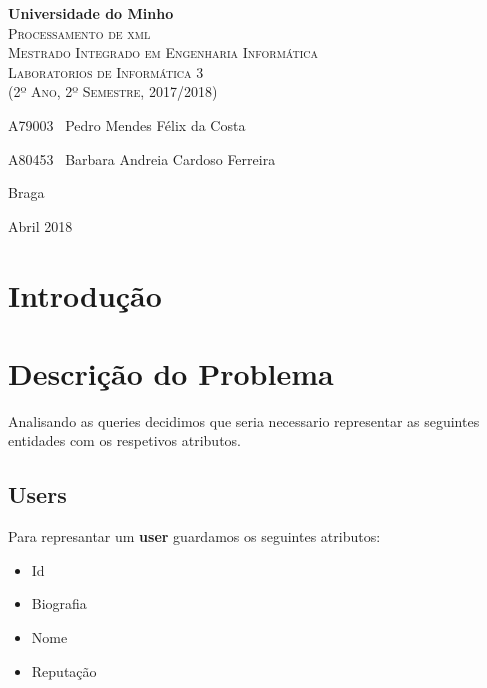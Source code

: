 \documentclass[10pt,a4paper]{report}
\begin{document}
\begin{titlepage}
    \center
    \vspace*{4.0cm}
    {\huge {\bf Universidade do Minho}}\\[0.4cm]
    \vspace{3.0cm}
    \textsc{\huge{Processamento de xml}}\\[0.5cm] %
    \vspace{3.0cm}
    \textsc{\huge{Mestrado Integrado em Engenharia Informática}}\\[0.5cm]
    \vspace{2.0cm}
    \textsc{Laboratorios de Informática 3}\\[0.5cm]
    \textsc{(2º Ano, 2º Semestre, 2017/2018)}\\[0.5cm]
    \vspace{1.5cm}
    \begin{flushleft}
        A79003 \,\,\,Pedro Mendes Félix da Costa
        \vspace{0.2cm}

        A80453 \,\,\,Barbara Andreia Cardoso Ferreira
    \end{flushleft}
        \vspace{1cm}
    \begin{flushright}
        Braga

        Abril 2018
    \end{flushright}

\end{titlepage}

\tableofcontents %

\chapter{Introdução}


\chapter{Descrição do Problema}
    Analisando as queries decidimos que seria necessario representar
    as seguintes entidades com os respetivos atributos.

    \section{Users}
    Para represantar um \textbf{user} guardamos os seguintes atributos:
    \begin{itemize}
            \item Id
            \item Biografia
            \item Nome
            \item Reputação

    \end{itemize}
\end{document}
